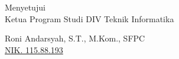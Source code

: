 \vspace{2cm}

\begin{center}
    Menyetujui\\
    Ketua Program Studi DIV Teknik Informatika
    
    \vspace{2.5cm}
    
    Roni Andarsyah, S.T., M.Kom., SFPC\\
    \underline{NIK. 115.88.193}
\end{center}

\vfill

\fancyhfoffset[L]{0cm}
\fancyhfoffset[R]{0cm}
\restoregeometry
